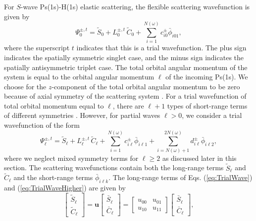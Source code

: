 \documentclass[preprint,showpacs,showkeys,preprintnumbers,amsmath,amssymb,longbibliography,pra,aps]{revtex4-1}
\begin{document}
For $S$-wave Ps(1s)-H(1s) elastic scattering, the flexible scattering
wavefunction is given by
\begin{equation}
\Psi_0^{\pm,t} = \widetilde{S}_0 + L_0^{\pm,t} \, \widetilde{C}_0
  + \sum_{i=1}^{N(\omega)} c_{i0}^\pm \bar{\phi}_{i01},
\label{eq:TrialWave}
\end{equation}
where the superscript $t$ indicates that this is a trial wavefunction. The plus
sign indicates the spatially symmetric singlet case, and the minus sign
indicates the spatially antisymmetric triplet case. The total orbital angular
momentum of the system is equal to the orbital angular momentum $\ell$ 
of the incoming Ps(1s). We choose for the $z$-component of the total orbital
angular momentum to be zero because of axial symmetry of the scattering
system \cite{VanReethThesis}.
For a trial wavefunction of total orbital momentum equal to $\ell$,
there are $\ell+1$ types of short-range terms of different symmetries
\cite{Schwartz1961a,Brown1985a,BrownThesis,WattsThesis,Humberston1997,VanReeth1997,Armour1991}.
However, for partial waves $\ell > 0$, we consider a trial
wavefunction of the form
\begin{equation}
\Psi_\ell^{\pm,t} = \widetilde{S}_\ell + L^{\pm,t}_\ell \, \widetilde{C}_\ell
 + \sum_{i=1}^{N(\omega)} c_{i\ell}^\pm \bar{\phi}_{i\ell 1}
 + \!\!\!\sum_{i=N(\omega)+1}^{2N(\omega)} \!\! d_{i\ell}^\pm \bar{\phi}_{i\ell 2},
\label{eq:TrialWaveHigher}
\end{equation}
where we neglect mixed symmetry terms for $\ell \ge 2$ as discussed later in this section.
The scattering wavefunctions contain both the long-range terms $\widetilde{S}_\ell$
and $\widetilde{C}_\ell$ and the short-range terms $\bar{\phi}_{i\ell k}$. The 
long-range terms of Eqs. (\ref{eq:TrialWave}) and (\ref{eq:TrialWaveHigher})
are given by
\begin{equation}
\label{eq:SCPhiDef}
\begin{bmatrix}
\widetilde{S}_\ell \\ \widetilde{C}_\ell
\end{bmatrix} = \textbf{u}  \begin{bmatrix}
\bar{S}_\ell \\ \bar{C}_\ell
\end{bmatrix} = \begin{bmatrix}
u_{00} & u_{01} \\  u_{10} & u_{11}
\end{bmatrix}
\begin{bmatrix}
\bar{S}_\ell \\ \bar{C}_\ell
\end{bmatrix}, 
\end{equation}
\end{document}
